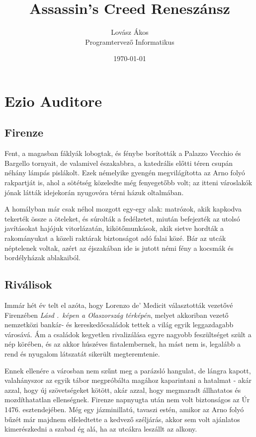 \documentclass[12pt, a4paper, twoside]{report}
\title{Assassin's Creed Reneszánsz}
\author{Lovász Ákos\\Programtervező Informatikus}
\date{\today}
\theoremstyle{definition}
\theoremstyle{remark}
\begin{document}
\maketitle
\tableofcontents


\chapter{Ezio Auditore}
\section{Firenze}
Fent, a magasban fáklyák lobogtak, és fénybe borították a Palazzo Vecchio és Bargello tornyait, de valamivel északabbra, a katedrális előtti téren csupán néhány lámpás pislákolt. Ezek némelyike gyengén megvilágította az Arno folyó rakpartját is, ahol a sötétség közeledte még fenyegetőbb volt; az itteni városlakók jónak látták idejekorán nyugovóra  térni  házuk  oltalmában. 

A homályban  már  csak  néhol mozgott  egy-egy  alak:  matrózok,  akik  kapkodva  tekerték  össze  a öteleket, és  súrolták  a  fedélzetet,  miután  befejezték  az  utolsó javításokat hajójuk vitorlázatán, kikötőmunkások, akik sietve hordták a rakományukat a közeli
raktárak biztonságot adó falai közé. Bár az utcák néptelenek voltak, azért az éjszakában ide is jutott némi fény a kocsmák és bordélyházak ablakaiból.

\section{Riválisok}
Immár hét év telt el azóta, hogy Lorenzo de' Medicit választották 
vezetővé Firenzében \emph{Lásd \az{\ref{abra-olasz}}.~képen a Olaszország térképén}, melyet akkoriban vezető nemzetközi bankár- és 
kereskedőcsaládok tettek a világ egyik leggazdagabb városává. Ám a 
családok kegyetlen rivalizálása egyre  nagyobb  feszültséget szült a 
nép körében, és az akkor húszéves fiatalembernek, ha mást nem is, 
legalább a rend és nyugalom látszatát sikerült megteremtenie. 

Ennek ellenére a városban nem szűnt meg a parázsló hangulat, de lángra 
kapott,  valahányszor  az  egyik  tábor  megpróbálta  magához 
kaparintani  a hatalmat - akár azzal, hogy új  szövetségeket kötött, 
akár azzal, hogy megmaradt állhatatos és mozdíthatatlan ellenségnek. 
Firenze  napnyugta  után  nem  volt  biztonságos  az  Úr  1476. 
esztendejében. Még egy jázminillatú, tavaszi estén, amikor az Arno 
folyó bűzét már majdnem elfeledtette a kedvező széljárás, akkor sem 
volt ajánlatos kimerészkedni a szabad ég alá, ha az utcákra leszállt az 
alkony. 
\end{document}
